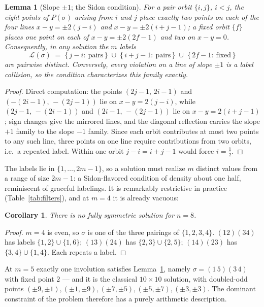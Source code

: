 \documentclass[11pt]{article}
\newtheorem{lemma}{Lemma}
\newtheorem{corollary}{Corollary}
\theoremstyle{remark}
\begin{document}
\begin{lemma}[Slope $\pm1$; the Sidon condition]\label{lem:S}
For a pair orbit $\{i,j\}$, $i<j$, the eight points of $P(\sigma)$ arising
from $i$ and $j$ place exactly two points on each of the four lines
$x-y=\pm2(j-i)$ and $x-y=\pm2(i+j-1)$;
a fixed orbit $\{f\}$ places one point on each of $x-y=\pm2(2f-1)$ and two
on $x-y=0$.
Consequently, in any solution the $m$ labels
\[
\mathcal L(\sigma)\;=\;\{\,j-i:\ \text{pairs}\,\}\;\cup\;
\{\,i+j-1:\ \text{pairs}\,\}\;\cup\;\{\,2f-1:\ \text{fixed}\,\}
\]
are pairwise distinct.
Conversely, every violation on a line of slope $\pm1$ is a label collision,
so the condition characterizes this family exactly.
\end{lemma}

\begin{proof}
Direct computation: the points $(2j-1,\,2i-1)$ and $(-(2i-1),\,-(2j-1))$ lie
on $x-y=2(j-i)$,
while $(2j-1,\,-(2i-1))$ and $(2i-1,\,-(2j-1))$ lie on $x-y=2(i+j-1)$;
sign changes give the mirrored lines,
and the diagonal reflection carries the slope $+1$ family to the slope $-1$
family.
Since each orbit contributes at most two points to any such line,
three points on one line require contributions from two orbits,
i.e.\ a repeated label.
Within one orbit $j-i=i+j-1$ would force $i=\tfrac12$.
\end{proof}

The labels lie in $\{1,\dots,2m-1\}$,
so a solution must realize $m$ distinct values from a range of size $2m-1$:
a Sidon-flavored condition of density about one half,
reminiscent of graceful labelings.
It is remarkably restrictive in practice (Table~\ref{tab:filters}),
and at $m=4$ it is already vacuous:

\begin{corollary}\label{cor:n8}
There is no fully symmetric solution for $n=8$.
\end{corollary}

\begin{proof}
$m=4$ is even, so $\sigma$ is one of the three pairings of $\{1,2,3,4\}$.
$(12)(34)$ has labels $\{1,2\}\cup\{1,6\}$;
$(13)(24)$ has $\{2,3\}\cup\{2,5\}$;
$(14)(23)$ has $\{3,4\}\cup\{1,4\}$.
Each repeats a label.
\end{proof}

At $m=5$ exactly one involution satisfies Lemma~\ref{lem:S},
namely $\sigma=(1\,5)(3\,4)$ with fixed point $2$ ---
and it is the classical $10\times10$ solution,
with doubled-odd points
$(\pm9,\pm1),(\pm1,\pm9),(\pm7,\pm5),(\pm5,\pm7),(\pm3,\pm3)$.
The dominant constraint of the problem therefore has a purely arithmetic
description.
\end{document}
